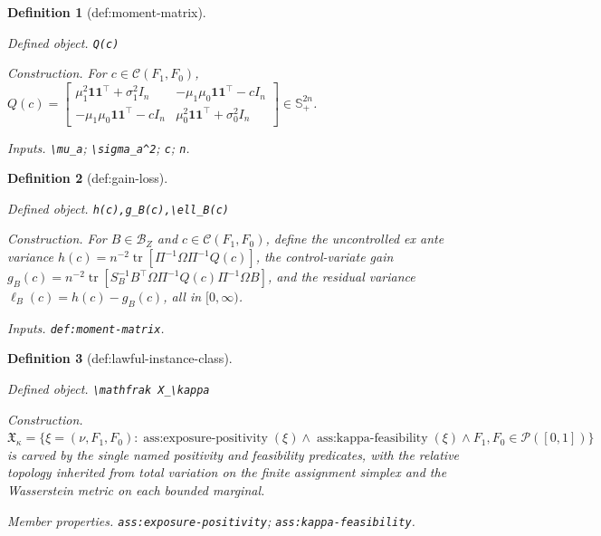 \documentclass{article}
\newtheorem{definition}{Definition}
\begin{document}
\begin{definition}[def:moment-matrix]\label{def:moment-matrix}
\par\smallskip\noindent\emph{Defined object.} \texttt{Q(c)}
\par\smallskip\noindent\emph{Construction.} For \(c\in\mathcal C(F_1,F_0)\), \(Q(c)=\begin{bmatrix}\mu_1^2\mathbf 1\mathbf 1^{\top}+\sigma_1^2I_n&-\mu_1\mu_0\mathbf 1\mathbf 1^{\top}-cI_n\\-\mu_1\mu_0\mathbf 1\mathbf 1^{\top}-cI_n&\mu_0^2\mathbf 1\mathbf 1^{\top}+\sigma_0^2I_n\end{bmatrix}\in\mathbb S_+^{2n}\).
\par\smallskip\noindent\emph{Inputs.} \texttt{\textbackslash{}\allowbreak{}mu\_\allowbreak{}a}; \texttt{\textbackslash{}\allowbreak{}sigma\_\allowbreak{}a\textasciicircum{}2}; \texttt{c}; \texttt{n}.
\end{definition}

\begin{definition}[def:gain-loss]\label{def:gain-loss}
\par\smallskip\noindent\emph{Defined object.} \texttt{h(c),\allowbreak{}g\_\allowbreak{}B(c),\allowbreak{}\textbackslash{}\allowbreak{}ell\_\allowbreak{}B(c)}
\par\smallskip\noindent\emph{Construction.} For \(B\in\mathcal B_Z\) and \(c\in\mathcal C(F_1,F_0)\), define the uncontrolled ex ante variance \(h(c)=n^{-2}\operatorname{tr}[\Pi^{-1}\Omega\Pi^{-1}Q(c)]\), the control-variate gain \(g_B(c)=n^{-2}\operatorname{tr}[S_B^{-1}B^{\top}\Omega\Pi^{-1}Q(c)\Pi^{-1}\Omega B]\), and the residual variance \(\ell_B(c)=h(c)-g_B(c)\), all in \([0,\infty)\).
\par\smallskip\noindent\emph{Inputs.} \texttt{def:\allowbreak{}moment-\allowbreak{}matrix}.
\end{definition}

\begin{definition}[def:lawful-instance-class]\label{def:lawful-instance-class}
\par\smallskip\noindent\emph{Defined object.} \texttt{\textbackslash{}\allowbreak{}mathfrak X\_\allowbreak{}\textbackslash{}\allowbreak{}kappa}
\par\smallskip\noindent\emph{Construction.} \(\mathfrak X_\kappa=\{\xi=(\nu,F_1,F_0):\operatorname{ass{:}exposure\mbox{-}positivity}(\xi)\wedge\operatorname{ass{:}kappa\mbox{-}feasibility}(\xi)\wedge F_1,F_0\in\mathcal P([0,1])\}\) is carved by the single named positivity and feasibility predicates, with the relative topology inherited from total variation on the finite assignment simplex and the Wasserstein metric on each bounded marginal.
\par\smallskip\noindent\emph{Member properties.} \texttt{ass:\allowbreak{}exposure-\allowbreak{}positivity}; \texttt{ass:\allowbreak{}kappa-\allowbreak{}feasibility}.
\end{definition}
\end{document}
